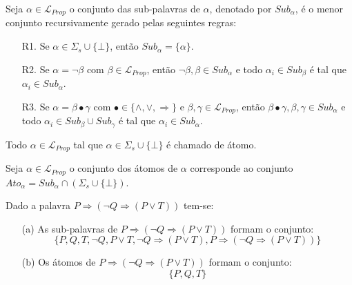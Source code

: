 \begin{definition}
   Seja $\alpha \in \mathcal{L}_{Prop}$ o conjunto das sub-palavras de $\alpha$, denotado por $Sub_{\alpha}$, é o menor conjunto recursivamente gerado pelas seguintes regras:
   \begin{itemize}
        \item[R1.] Se $\alpha \in \Sigma_s \cup \{\bot\}$, então $Sub_\alpha = \{\alpha\}$.
        \item[R2.] Se $\alpha = \neg \beta$ com $\beta \in \mathcal{L}_{Prop}$, então $\neg \beta, \beta \in Sub_\alpha$ e todo $\alpha_i \in Sub_\beta$ é tal que $\alpha_i \in Sub_\alpha$.
        \item[R3.] Se $\alpha = \beta \bullet \gamma$  com $\bullet \in \{\land, \lor, \Rightarrow\}$ e $\beta, \gamma \in \mathcal{L}_{Prop}$, então $\beta \bullet \gamma, \beta, \gamma \in Sub_\alpha$ e todo $\alpha_i \in Sub_\beta \cup Sub_\gamma$ é tal que $\alpha_i \in Sub_\alpha$.
   \end{itemize}
\end{definition}

\begin{definition}[Átomos]
   Todo $\alpha \in \mathcal{L}_{Prop}$ tal que $\alpha \in \Sigma_s \cup \{\bot\}$ é chamado de átomo.
\end{definition}

\begin{definition}
   Seja $\alpha \in \mathcal{L}_{Prop}$ o conjunto dos átomos de $\alpha$  corresponde ao conjunto $Ato_\alpha = Sub_\alpha \cap (\Sigma_s \cup \{\bot\})$. 
\end{definition}

\begin{exem}
    Dado a palavra $P \Rightarrow (\neg Q \Rightarrow (P \lor T))$ tem-se:
    \begin{itemize}
        \item[(a)] As sub-palavras de $P \Rightarrow (\neg Q \Rightarrow (P \lor T))$ formam o conjunto:
        $$\{P, Q, T, \neg Q, P \lor T, \neg Q \Rightarrow (P \lor T), P \Rightarrow (\neg Q \Rightarrow (P \lor T))\}$$
        \item[(b)] Os átomos de $P \Rightarrow (\neg Q \Rightarrow (P \lor T))$ formam o conjunto:
        $$\{P, Q, T\}$$
    \end{itemize}
\end{exem}

